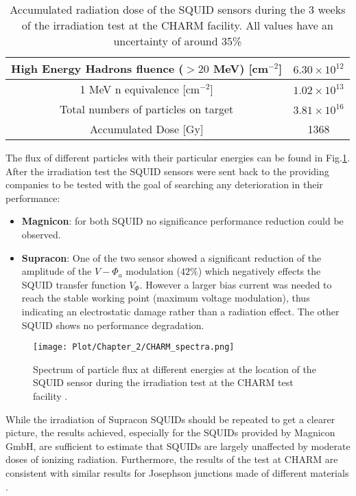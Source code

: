 \documentclass[12pt,a4paper]{report}
\begin{document}
    \begin{table}[H]
    	\centering
    	\begin{tabular}{c|c}
    		\hline
    		High Energy Hadrons fluence ($> 20$ MeV) [cm$^{-2}$] & $6.30\times 10^{12}$ \\ \hline
    		1 MeV n equivalence [cm$^{-2}$] & $1.02\times 10^{13}$ \\ \hline
    		Total numbers of particles on target & $3.81\times 10^{16}$ \\ \hline
    		Accumulated Dose [Gy] & 1368 \\ \hline
    	\end{tabular}
    	\caption{Accumulated radiation dose of the SQUID sensors during the 3 weeks of the irradiation test at the CHARM facility. All values have an uncertainty of around 35\% \cite{Cern_report} }
    	\label{Dose_SQUID}
    \end{table}
    The flux of different particles with their particular energies can be found in Fig.\ref{CHARM_flux}.\\
    After the irradiation test the SQUID sensors were sent back to the providing companies to be tested with the goal of searching any deterioration in their performance:
    \begin{itemize}
    	\item \textbf{Magnicon}: for both SQUID no significance performance reduction could be observed.
    	\item \textbf{Supracon}: One of the two sensor showed a significant reduction of the amplitude of the $V-\Phi_a$ modulation ($42 \%$) which negatively effects the SQUID transfer function $V_\Phi$. However a larger bias current was needed to reach the stable working point (maximum voltage modulation), thus indicating an electrostatic damage rather than a radiation effect. The other SQUID shows no performance degradation.
    \end{itemize}
     \begin{figure} [H]
    	\centering
    	\texttt{[image: Plot/Chapter\_2/CHARM\_spectra.png]}
    	\caption{\small{Spectrum of particle flux at different energies at the location of the SQUID sensor during the irradiation test at the CHARM test facility \cite{Cern_report}.}}
    	\label{CHARM_flux}
    \end{figure}
   While the irradiation of Supracon SQUIDs should be repeated to get a clearer picture, the results achieved, especially for the SQUIDs provided by Magnicon GmbH, are sufficient to estimate that SQUIDs are largely unaffected by moderate doses of ionizing radiation. Furthermore, the results of the test at CHARM are consistent with similar results for Josephson junctions made of different materials \cite{Irradiation_test_squid}. \\
\end{document}
